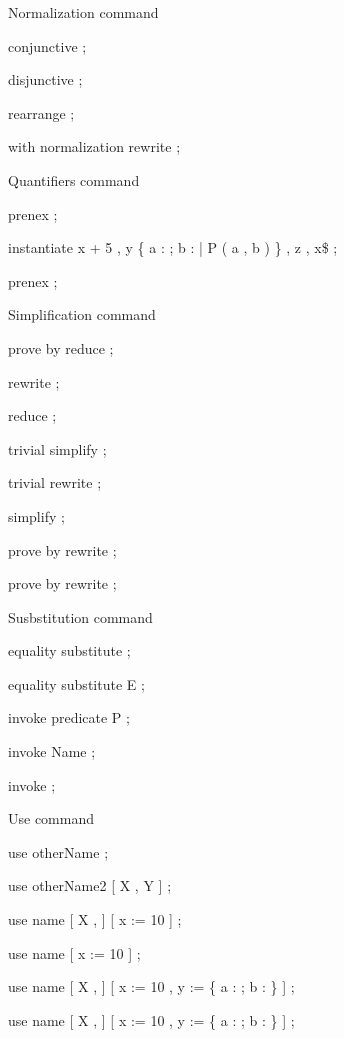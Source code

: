 Normalization command

\begin{zproof}[normCmd]

 conjunctive ;
 
 disjunctive ;
 
 rearrange ;
 
 with normalization rewrite ;
 

\end{zproof}



Quantifiers command

\begin{zproof}[qntCmd]

 prenex ;
 
 instantiate x  + 5 , y  \{ a : \nat ; b : \nat | P ( a , b ) \} , z  , x\$   ;
 
 prenex ;
 

\end{zproof}



Simplification command

\begin{zproof}[simpCmd]

 prove by reduce ;
 
 rewrite ;
 
 reduce ;
 
 trivial simplify ;
 
 trivial rewrite ;
 
 simplify ;
 
 prove by rewrite ;
 
 prove by rewrite ;
 

\end{zproof}



Susbstitution command

\begin{zproof}[substCmd]

 equality substitute ;
 
 equality substitute E ;
 
 invoke predicate P ;
 
 invoke Name ;
 
 invoke ;
 

\end{zproof}



Use command

\begin{zproof}[useCmd]

 use otherName ;
 
 use otherName2 [ X , Y ] ;
 
 use name [ X , \power \nat ] [ x := 10 ] ;
 
 use name [ x := 10 ] ;
 
 use name [ X , \power \nat ] [ x := 10 , y := \{ a : \nat ; b : \nat \} ] ;
 
 use name [ X , \power \nat ] [ x := 10 , y := \{ a : \nat ; b : \nat \} ] ;
 

\end{zproof}



